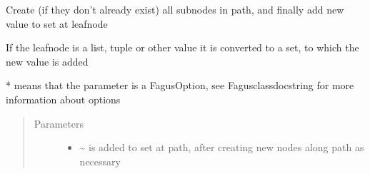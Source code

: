 \documentclass[a4paper,10pt,english]{sphinxmanual}
\begin{document}
\begin{fulllineitems}
\begin{fulllineitems}
\label{\detokenize{fagus.fagus:fagus.fagus.Fagus.add}}
\pysigstartsignatures
{}
\pysigstopsignatures
\sphinxAtStartPar
Create (if they don’t already exist) all sub\sphinxhyphen{}nodes in path, and finally add new value to set at leaf\sphinxhyphen{}node

\sphinxAtStartPar
If the leaf\sphinxhyphen{}node is a list, tuple or other value it is converted to a set, to which the new value is added

\sphinxAtStartPar
* means that the parameter is a FagusOption, see Fagus\sphinxhyphen{}class\sphinxhyphen{}docstring for more information about options
\begin{quote}\begin{description}
\item[{Parameters}] \leavevmode\begin{itemize}
\item {}
\sphinxAtStartPar
{} \textendash{} \textasciitilde{} is added to set at path, after creating new nodes along path as necessary


\end{itemize}
\end{description}
\end{quote}
\end{fulllineitems}
\end{fulllineitems}
\end{document}
